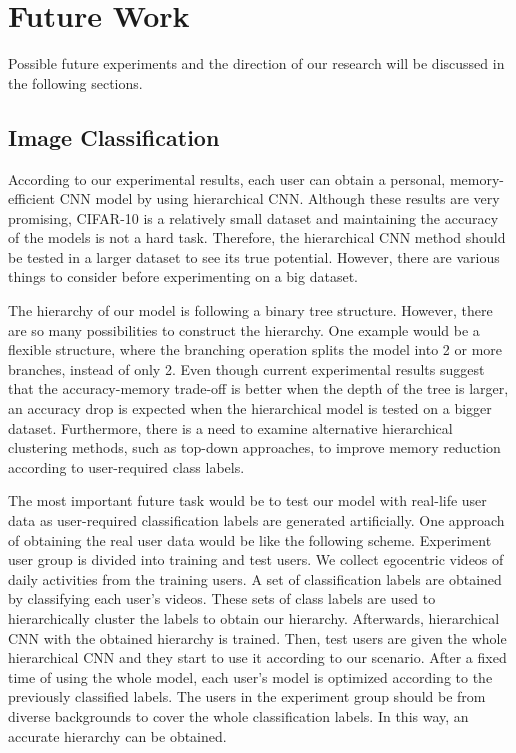 \section{Future Work}

Possible future experiments and the direction of our research will be discussed in the following sections.

\subsection*{Image Classification}

According to our experimental results, each user can obtain a personal, memory-efficient CNN model by using hierarchical CNN.
Although these results are very promising, CIFAR-10 is a relatively small dataset and maintaining the accuracy of the models is not a hard task.
Therefore, the hierarchical CNN method should be tested in a larger dataset to see its true potential. 
However, there are various things to consider before experimenting on a big dataset.

The hierarchy of our model is following a binary tree structure. 
However, there are so many possibilities to construct the hierarchy. 
One example would be a flexible structure, where the branching operation splits the model into 2 or more branches, instead of only 2. 
Even though current experimental results suggest that the accuracy-memory trade-off is better when the depth of the tree is larger, an accuracy drop is expected when the hierarchical model is tested on a bigger dataset.
Furthermore, there is a need to examine alternative hierarchical clustering methods, such as top-down approaches, to improve memory reduction according to user-required class labels.

The most important future task would be to test our model with real-life user data as user-required classification labels are generated artificially.
One approach of obtaining the real user data would be like the following scheme.
Experiment user group is divided into training and test users. 
We collect egocentric videos of daily activities from the training users.
A set of classification labels are obtained by classifying each user's videos.
These sets of class labels are used to hierarchically cluster the labels to obtain our hierarchy. 
Afterwards, hierarchical CNN with the obtained hierarchy is trained. 
Then, test users are given the whole hierarchical CNN and they start to use it according to our scenario. 
After a fixed time of using the whole model, each user's model is optimized according to the previously classified labels.
The users in the experiment group should be from diverse backgrounds to cover the whole classification labels. 
In this way, an accurate hierarchy can be obtained.


